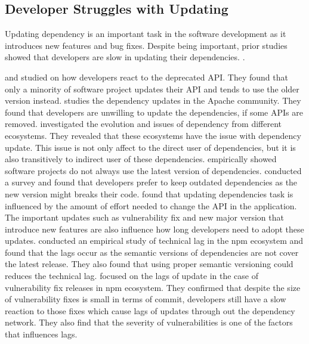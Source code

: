 \documentclass[conference]{IEEEtran}
\newcommand{\boxedtext}[1]{\fbox{\scriptsize\bfseries\textsf{#1}}}
\newcommand{\nota}[2]{
	\boxedtext{#1}
	{\small$\blacktriangleright$\emph{\textsl{#2}}$\blacktriangleleft$}
}
\newcommand{\todo}[1]{{\color{red}\nota{TODO}{#1}}}
\begin{document}
	\subsection{Developer Struggles with Updating}
    Updating dependency is an important task in the software development as it introduces new features and bug fixes.
    Despite being important, prior studies showed that developers are slow in updating their dependencies.
    \citep{Robbes:2012, Hora:2015, Sawant2016, Bavota:2015, Ihara:2017}. 
    
    \citet{Robbes:2012} and \citet{Sawant2016} studied on how developers react to the deprecated API.
    They found that only a minority of software project updates their API and tends to use the older version instead.
    \citet{Bavota:2015} studies the dependency updates in the Apache community.
    They found that developers are unwilling to update the dependencies, if some APIs are removed.
	\citet{Decan:2017} investigated the evolution and issues of dependency from different ecosystems.
	They revealed that these ecosystems have the issue with dependency update.
	This issue is not only affect to the direct user of dependencies, but it is also transitively to indirect user of these dependencies.
    \citet{Ihara:2017} empirically showed software projects do not always use the latest version of dependencies.
	\citet{Bogart:2015} conducted a survey and found that developers prefer to keep outdated dependencies as the new version might breaks their code.
	\citet{Kula:2017} found that updating dependencies task is influenced by the amount of effort needed to change the API in the application.
	The important updates such as vulnerability fix and new major version that introduce new features are also influence how long developers need to adopt these updates.
	\citet{Decan:ICSME:2018} conducted an empirical study of technical lag in the npm ecosystem and found that the lags occur as the semantic versions of dependencies are not cover the latest release.
	They also found that using proper semantic versioning could reduces the technical lag.
	\citet{Chinthanet2021} focused on the lags of update in the case of vulnerability fix releases in npm ecosystem.
	They confirmed that despite the size of vulnerability fixes is small in terms of commit, developers still have a slow reaction to those fixes which cause lags of updates through out the dependency network.
	They also find that the severity of vulnerabilities is one of the factors that influences lags.
	
\end{document}
